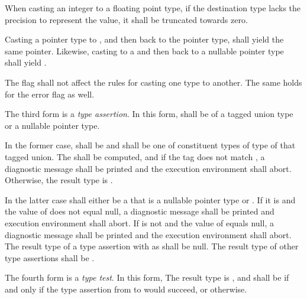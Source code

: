\specsubsubitem
When casting an integer to a floating point type, if the destination type
lacks the precision to represent the value, it shall be truncated towards zero.

\specsubsubitem
Casting a pointer type to , and then back to the pointer
type, shall yield the same pointer. Likewise, casting  to a
 and then back to a nullable pointer type shall yield
.


\specsubsubitem
The  flag shall not affect the rules for casting one type to
another. The same holds for the error flag as well.

\specsubsubitem
The third form is a \textit{type assertion}. In this form,
 shall be of a tagged union type or a nullable
pointer type.

In the former case,  shall be 
and shall be one of constituent types of type of that tagged union. The
 shall be computed, and if the tag does not match
, a diagnostic message shall be printed and the execution
environment shall abort. Otherwise, the result type is .

In the latter case  shall either be a
 that is a nullable pointer type or . If it is
 and the value of  does not equal
null, a diagnostic message shall be printed and execution environment shall
abort. If  is not  and the value
of  equals null, a diagnostic message shall be
printed and the execution environment shall abort. The result type of a type
assertion with  as  shall be null.
The result type of other type assertions shall be .

\specsubsubitem The fourth form is a \textit{type test}. In this form, The
result type is , and shall be  if and only if the
type assertion from  to
 would succeed, or  otherwise.

